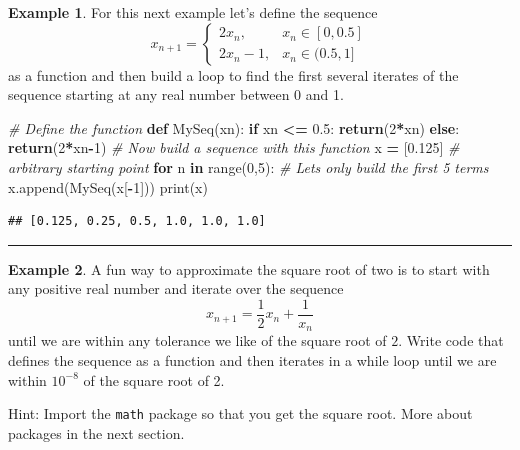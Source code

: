 \documentclass[
]{book}
\newenvironment{Shaded}{\begin{snugshade}}{\end{snugshade}}
\newcommand{\BuiltInTok}[1]{#1}
\newcommand{\CommentTok}[1]{\textcolor[rgb]{0.56,0.35,0.01}{\textit{#1}}}
\newcommand{\ControlFlowTok}[1]{\textcolor[rgb]{0.13,0.29,0.53}{\textbf{#1}}}
\newcommand{\DecValTok}[1]{\textcolor[rgb]{0.00,0.00,0.81}{#1}}
\newcommand{\FloatTok}[1]{\textcolor[rgb]{0.00,0.00,0.81}{#1}}
\newcommand{\KeywordTok}[1]{\textcolor[rgb]{0.13,0.29,0.53}{\textbf{#1}}}
\newcommand{\NormalTok}[1]{#1}
\newcommand{\OperatorTok}[1]{\textcolor[rgb]{0.81,0.36,0.00}{\textbf{#1}}}
\theoremstyle{definition}
\theoremstyle{definition}
\newtheorem{example}{Example}[chapter]
\theoremstyle{definition}
\theoremstyle{remark}
\begin{document}
\begin{example}
\protect\hypertarget{exm:unnamed-chunk-686}{}{\label{exm:unnamed-chunk-686} }For this next example let's define the sequence
\[x_{n+1} = \left\{ \begin{array}{ll} 2x_n, & x_n \in [0,0.5] \\ 2x_n - 1, & x_n \in (0.5,1] \end{array} \right.\]
as a function and then build a loop to find the first several iterates of the sequence starting at any real number between 0 and 1.
\end{example}

\begin{Shaded}
\begin{Highlighting}[]
\CommentTok{\# Define the function}
\KeywordTok{def}\NormalTok{ MySeq(xn):}
    \ControlFlowTok{if}\NormalTok{ xn }\OperatorTok{\textless{}=} \FloatTok{0.5}\NormalTok{:}
        \ControlFlowTok{return}\NormalTok{(}\DecValTok{2}\OperatorTok{*}\NormalTok{xn)}
    \ControlFlowTok{else}\NormalTok{:}
        \ControlFlowTok{return}\NormalTok{(}\DecValTok{2}\OperatorTok{*}\NormalTok{xn}\OperatorTok{{-}}\DecValTok{1}\NormalTok{)}
\CommentTok{\# Now build a sequence with this function}
\NormalTok{x }\OperatorTok{=}\NormalTok{ [}\FloatTok{0.125}\NormalTok{] }\CommentTok{\# arbitrary starting point}
\ControlFlowTok{for}\NormalTok{ n }\KeywordTok{in} \BuiltInTok{range}\NormalTok{(}\DecValTok{0}\NormalTok{,}\DecValTok{5}\NormalTok{): }\CommentTok{\# Let\textquotesingle{}s only build the first 5 terms}
\NormalTok{    x.append(MySeq(x[}\OperatorTok{{-}}\DecValTok{1}\NormalTok{]))}
\BuiltInTok{print}\NormalTok{(x)}
\end{Highlighting}
\end{Shaded}

\begin{verbatim}
## [0.125, 0.25, 0.5, 1.0, 1.0, 1.0]
\end{verbatim}

\begin{center}\rule{0.5\linewidth}{0.5pt}\end{center}

\begin{example}
\protect\hypertarget{exm:unnamed-chunk-688}{}{\label{exm:unnamed-chunk-688} }A fun way to approximate the square root of two is to start with any positive real number and iterate over the sequence
\[x_{n+1} = \frac{1}{2} x_n + \frac{1}{x_n}\]
until we are within any tolerance we like of the square root of \(2\). Write code that defines the sequence as a function and then iterates in a while loop until we are within \(10^{-8}\) of the square root of 2.

Hint: Import the \texttt{math} package so that you get the square root. More about packages in the next section.
\end{example}
\end{document}
